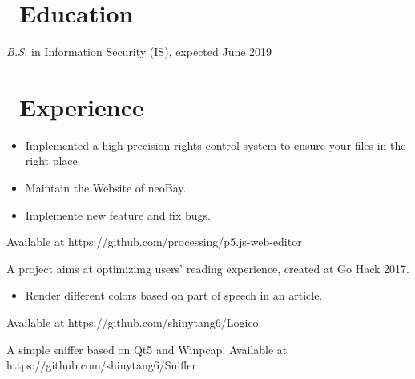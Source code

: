 \documentclass{resume}
\begin{document}



\section{\faGraduationCap\ Education}
\textit{B.S.} in Information Security (IS), expected June 2019

\section{\faUsers\ Experience}
\begin{itemize}
  \item Implemented a high-precision rights control system to ensure your files in the right place.
  \item Maintain the Website of neoBay.
\end{itemize}

\begin{itemize}
  \item Implemente new feature and fix bugs.
\end{itemize}
Available at https://github.com/processing/p5.js-web-editor

A project aims at optimizimg users' reading experience, created at Go Hack 2017.
\begin{itemize}
  \item Render different colors based on part of speech in an article.
\end{itemize}
Available at https://github.com/shinytang6/Logico

A simple sniffer based on Qt5 and Winpcap.
Available at https://github.com/shinytang6/Sniffer
\end{document}
